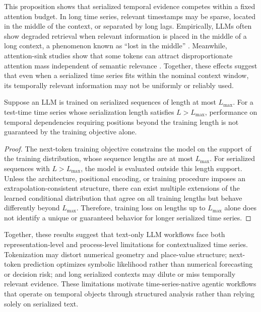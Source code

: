 This proposition shows that serialized temporal evidence competes within a fixed
attention budget. In long time series, relevant timestamps may be sparse, located
in the middle of the context, or separated by long lags. Empirically, LLMs often
show degraded retrieval when relevant information is placed in the middle of a
long context, a phenomenon known as ``lost in the middle'' \citep{liu2024lost, laban2025llms}.
Meanwhile, attention-sink studies show that some tokens can attract
disproportionate attention mass independent of semantic relevance \citep{xiao2024efficient, gu2025attention, kang2025see}.
Together, these effects suggest that even when a serialized time series fits
within the nominal context window, its temporally relevant information may not be
uniformly or reliably used.


\begin{corollary}
\label{cor:length_extrapolation}
Suppose an LLM is trained on serialized sequences of length at most $L_{\max}$.
For a test-time time series whose serialization length satisfies $L>L_{\max}$,
performance on temporal dependencies requiring positions beyond the training
length is not guaranteed by the training objective alone.
\end{corollary}

\begin{proof}
The next-token training objective constrains the model on the support of the
training distribution, whose sequence lengths are at most $L_{\max}$. For
serialized sequences with $L>L_{\max}$, the model is evaluated outside this
length support. Unless the architecture, positional encoding, or training
procedure imposes an extrapolation-consistent structure, there can exist multiple
extensions of the learned conditional distribution that agree on all training
lengths but behave differently beyond $L_{\max}$. Therefore, training loss on
lengths up to $L_{\max}$ alone does not identify a unique or guaranteed behavior
for longer serialized time series.
\end{proof}

Together, these results suggest that text-only LLM workflows face both
representation-level and process-level limitations for contextualized time
series. Tokenization may distort numerical geometry and place-value structure;
next-token prediction optimizes symbolic likelihood rather than numerical
forecasting or decision risk; and long serialized contexts may dilute or miss
temporally relevant evidence. These limitations motivate time-series-native
agentic workflows that operate on temporal objects through structured analysis
rather than relying solely on serialized text.



